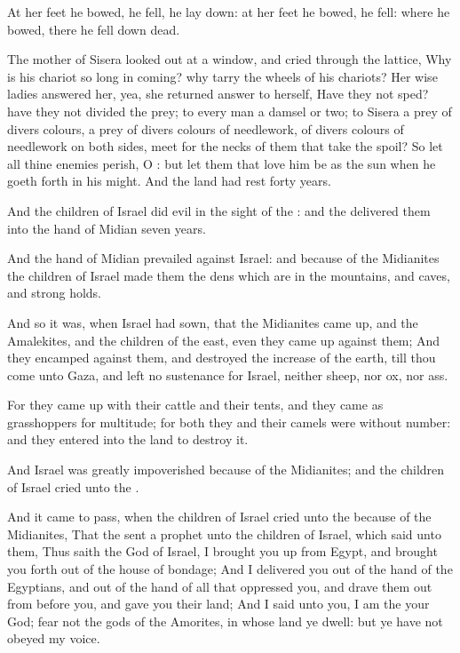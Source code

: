 \Verse At her feet he bowed, he fell, he lay down: at her feet he bowed, he fell: where he bowed, there he fell down dead.

\Verse The mother of Sisera looked out at a window, and cried through the lattice, Why is his chariot so long in coming? why tarry the wheels of his chariots?  \Verse Her wise ladies answered her, yea, she returned answer to herself, \Verse Have they not sped? have they not divided the prey; to every man a damsel or two; to Sisera a prey of divers colours, a prey of divers colours of needlework, of divers colours of needlework on both sides, meet for the necks of them that take the spoil?  \Verse So let all thine enemies perish, O \LORD: but let them that love him be as the sun when he goeth forth in his might. And the land had rest forty years.


\Chapter
\Verse And the children of Israel did evil in the sight of the \LORD: and the \LORD delivered them into the hand of Midian seven years.

\Verse And the hand of Midian prevailed against Israel: and because of the Midianites the children of Israel made them the dens which are in the mountains, and caves, and strong holds.

\Verse And so it was, when Israel had sown, that the Midianites came up, and the Amalekites, and the children of the east, even they came up against them; \Verse And they encamped against them, and destroyed the increase of the earth, till thou come unto Gaza, and left no sustenance for Israel, neither sheep, nor ox, nor ass.

\Verse For they came up with their cattle and their tents, and they came as grasshoppers for multitude; for both they and their camels were without number: and they entered into the land to destroy it.

\Verse And Israel was greatly impoverished because of the Midianites; and the children of Israel cried unto the \LORD.

\Verse And it came to pass, when the children of Israel cried unto the \LORD because of the Midianites, \Verse That the \LORD sent a prophet unto the children of Israel, which said unto them, Thus saith the \LORD God of Israel, I brought you up from Egypt, and brought you forth out of the house of bondage; \Verse And I delivered you out of the hand of the Egyptians, and out of the hand of all that oppressed you, and drave them out from before you, and gave you their land; \Verse And I said unto you, I am the \LORD your God; fear not the gods of the Amorites, in whose land ye dwell: but ye have not obeyed my voice.

